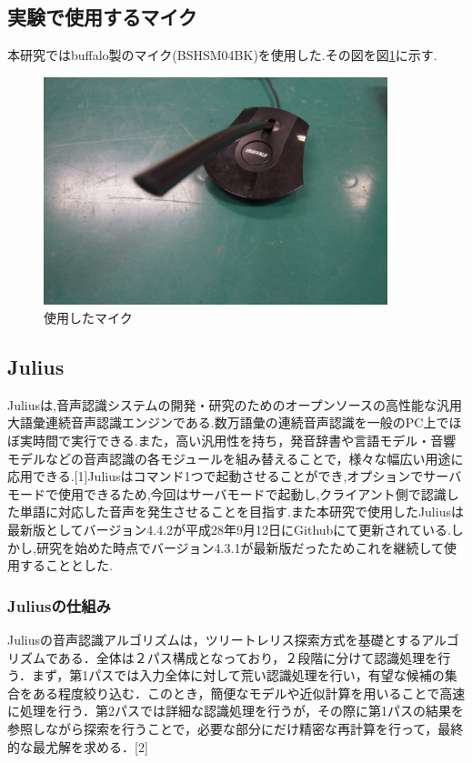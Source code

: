 \documentclass[12pt,oneside]{sotsuken_paper}
\begin{document}
\subsection{実験で使用するマイク}
本研究ではbuffalo製のマイク(BSHSM04BK)を使用した.その図を図\ref{fig:mic}に示す.


\begin{figure}[htbp]
\begin{center}
\includegraphics[width=100mm]{img/mic.JPG}
\caption{使用したマイク}
\label{fig:mic}
\end{center}
\end{figure}


\subsection{Julius}
Juliusは,音声認識システムの開発・研究のためのオープンソースの高性能な汎用大語彙連続音声認識エンジンである.数万語彙の連続音声認識を一般のPC上でほぼ実時間で実行できる.また，高い汎用性を持ち，発音辞書や言語モデル・音響モデルなどの音声認識の各モジュールを組み替えることで，様々な幅広い用途に応用できる.[1]Juliusはコマンド1つで起動させることができ,オプションでサーバモードで使用できるため,今回はサーバモードで起動し,クライアント側で認識した単語に対応した音声を発生させることを目指す.また本研究で使用したJuliusは最新版としてバージョン4.4.2が平成28年9月12日にGithubにて更新されている.しかし,研究を始めた時点でバージョン4.3.1が最新版だったためこれを継続して使用することとした.

\subsubsection{Juliusの仕組み}
Juliusの音声認識アルゴリズムは，ツリートレリス探索方式を基礎とするアルゴリズムである．全体は２パス構成となっており，２段階に分けて認識処理を行う．まず，第1パスでは入力全体に対して荒い認識処理を行い，有望な候補の集合をある程度絞り込む．このとき，簡便なモデルや近似計算を用いることで高速に処理を行う．第2パスでは詳細な認識処理を行うが，その際に第1パスの結果を参照しながら探索を行うことで，必要な部分にだけ精密な再計算を行って，最終的な最尤解を求める．[2]
\end{document}
